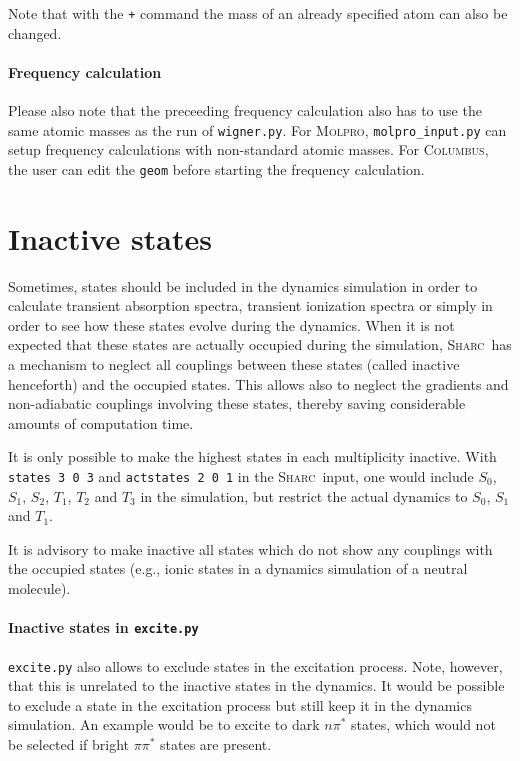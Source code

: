 \documentclass[a4paper,11pt,DIV=15,openany]{scrbook}
\newcommand{\sharc}{\textsc{Sharc}}
\newcommand{\ttt}[1]{\texttt{#1}}
\begin{document}
\normalsize
Note that with the \ttt{+} command the mass of an already specified atom can also be changed. 

\paragraph{Frequency calculation}

Please also note that the preceeding frequency calculation also has to use the same atomic masses as the run of \ttt{wigner.py}. For \textsc{Molpro}, \ttt{molpro\_input.py} can setup frequency calculations with non-standard atomic masses. For \textsc{Columbus}, the user can edit the \ttt{geom} before starting the frequency calculation.


\section{Inactive states}

Sometimes, states should be included in the dynamics simulation in order to calculate transient absorption spectra, transient ionization spectra or simply in order to see how these states evolve during the dynamics. When it is not expected that these states are actually occupied during the simulation, \sharc\ has a mechanism to neglect all couplings between these states (called inactive henceforth) and the occupied states. This allows also to neglect the gradients and non-adiabatic couplings involving these states, thereby saving considerable amounts of computation time. 

It is only possible to make the highest states in each multiplicity inactive. With \ttt{states 3 0 3} and \ttt{actstates 2 0 1} in the \sharc\ input, one would include $S_0$, $S_1$, $S_2$, $T_1$, $T_2$ and $T_3$ in the simulation, but restrict the actual dynamics to $S_0$, $S_1$ and $T_1$.

It is advisory to make inactive all states which do not show any couplings with the occupied states (e.g., ionic states in a dynamics simulation of a neutral molecule). 

\paragraph{Inactive states in \ttt{excite.py}}

\ttt{excite.py} also allows to exclude states in the excitation process. Note, however, that this is unrelated to the inactive states in the dynamics. It would be possible to exclude a state in the excitation process but still keep it in the dynamics simulation. An example would be to excite to dark $n\pi^*$ states, which would not be selected if bright $\pi\pi^*$ states are present.
\end{document}
